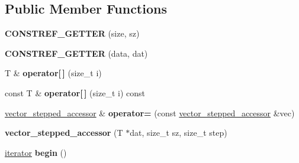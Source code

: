 \subsection*{Public Member Functions}
\begin{DoxyCompactItemize}
\item 
{\bfseries C\+O\+N\+S\+T\+R\+E\+F\+\_\+\+G\+E\+T\+T\+ER} (size, sz)\hypertarget{classmalgo_1_1vector__stepped__accessor_a11dee43045639721118a216a7a73f3c1}{}\label{classmalgo_1_1vector__stepped__accessor_a11dee43045639721118a216a7a73f3c1}

\item 
{\bfseries C\+O\+N\+S\+T\+R\+E\+F\+\_\+\+G\+E\+T\+T\+ER} (data, dat)\hypertarget{classmalgo_1_1vector__stepped__accessor_a9d4868a7068868f374be0f2b924ad213}{}\label{classmalgo_1_1vector__stepped__accessor_a9d4868a7068868f374be0f2b924ad213}

\item 
T \& {\bfseries operator\mbox{[}$\,$\mbox{]}} (size\+\_\+t i)\hypertarget{classmalgo_1_1vector__stepped__accessor_af85f8829860b6c441ea28c15702501bb}{}\label{classmalgo_1_1vector__stepped__accessor_af85f8829860b6c441ea28c15702501bb}

\item 
const T \& {\bfseries operator\mbox{[}$\,$\mbox{]}} (size\+\_\+t i) const \hypertarget{classmalgo_1_1vector__stepped__accessor_ad417822ef5d0ef84aed8269e35628e1b}{}\label{classmalgo_1_1vector__stepped__accessor_ad417822ef5d0ef84aed8269e35628e1b}

\item 
\hyperlink{classmalgo_1_1vector__stepped__accessor}{vector\+\_\+stepped\+\_\+accessor} \& {\bfseries operator=} (const \hyperlink{classmalgo_1_1vector__stepped__accessor}{vector\+\_\+stepped\+\_\+accessor} \&vec)\hypertarget{classmalgo_1_1vector__stepped__accessor_ac0ad48bb0844cb5a5ce29ed4731240a5}{}\label{classmalgo_1_1vector__stepped__accessor_ac0ad48bb0844cb5a5ce29ed4731240a5}

\item 
{\bfseries vector\+\_\+stepped\+\_\+accessor} (T $\ast$dat, size\+\_\+t sz, size\+\_\+t step)\hypertarget{classmalgo_1_1vector__stepped__accessor_a5bdf66b45bdfa473d50ddc77bd873ccd}{}\label{classmalgo_1_1vector__stepped__accessor_a5bdf66b45bdfa473d50ddc77bd873ccd}

\item 
\hyperlink{structmalgo_1_1step__ptr}{iterator} {\bfseries begin} ()\hypertarget{classmalgo_1_1vector__stepped__accessor_acd8d04f9ff30ae01211a81bc1ee105ee}{}\label{classmalgo_1_1vector__stepped__accessor_acd8d04f9ff30ae01211a81bc1ee105ee}


\end{DoxyCompactItemize}
